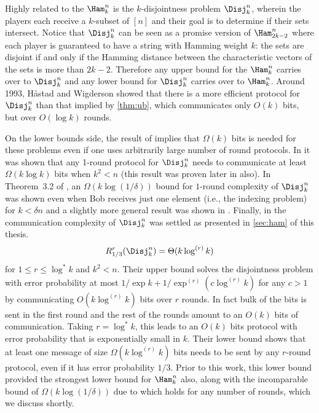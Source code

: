 Highly related to the $\Ham^n_k$ is the $k$-disjointness 
problem $\Disj^n_k$, wherein the players each receive a 
$k$-subset of $[n]$ and their goal is to determine if their 
sets intersect.
Notice that $\Disj^n_k$ can be seen as a promise version of
$\Ham^n_{2k-2}$ where each player is guaranteed to have a string
with Hamming weight $k$: the sets are disjoint if and only if the
Hamming distance between the characteristic vectors of the sets
is more than $2k-2$. Therefore any upper bound for the $\Ham^n_k$ 
carries over to $\Disj^n_k$ and any lower bound for $\Disj^n_k$
carries over to $\Ham^n_k$.
Around 1993, 
Håstad and Wigderson \cite{HastadW2007} showed that
there is a more efficient protocol for $\Disj^n_k$ than that implied 
by \autoref{thm:ub}, which communicates only $O(k)$ bits, but over
$O(\log k)$ rounds.

On the lower bounds side, the result of \cite{KalyanasundaramS1992}
implies that $\Omega(k)$ bits is needed for these problems even
if one uses arbitrarily large number of round protocols.
In \cite{BuhrmanGMW2012} it was shown that
any 1-round protocol for $\Disj^n_k$ needs to communicate
at least $\Omega(k \log k)$ bits when $k^2<n$
(this result was proven later in \cite{DasguptaKS12} also).
In Theorem~3.2 of \cite{Saglam2011}, an $\Omega(k\log(1/\delta))$
bound for $1$-round complexity of $\Disj^n_k$ was shown even 
when Bob receives just one element (i.e., the indexing problem) 
for $k<\delta n$ and a 
slightly more general result was shown in \cite{JayramW2011}.
Finally, in \cite{SaglamT2013} the communication complexity
of $\Disj^n_k$ was settled as presented in \autoref{sec:ham} 
of this thesis.
\begin{align*}
R^r_{1/3}(\Disj^n_k)=\Theta(k\log^{(r)}k)
\end{align*}
for $1\le r \le \log^*k$ and $k^2<n$.
Their upper bound solves the disjointness problem with 
error probability at most $1/\exp k + 1/\exp^{(r)}(c\log^{(r)}k)$ 
for any $c>1$ by communicating
$O(k \log^{(r)} k)$ bits over $r$ rounds. In fact bulk of the bits
is sent in the first round and the rest of the rounds
amount to an $O(k)$ bits of communication. Taking $r=\log^* k$,
this leads to an $O(k)$ bits protocol with error probability 
that is exponentially small in $k$.
Their lower bound shows that at least one
message of size 
$\Omega(k\log^{(r)} k)$ bits needs to be sent by any 
$r$-round protocol, even if it has error probability $1/3$.
Prior to this work, this lower bound provided the strongest lower
bound for $\Ham^n_k$ also, along with the incomparable bound of 
$\Omega(k\log (1/\delta))$ due to \cite{BlaisBG2014}
which holds for any number of rounds, which we discuss shortly.

